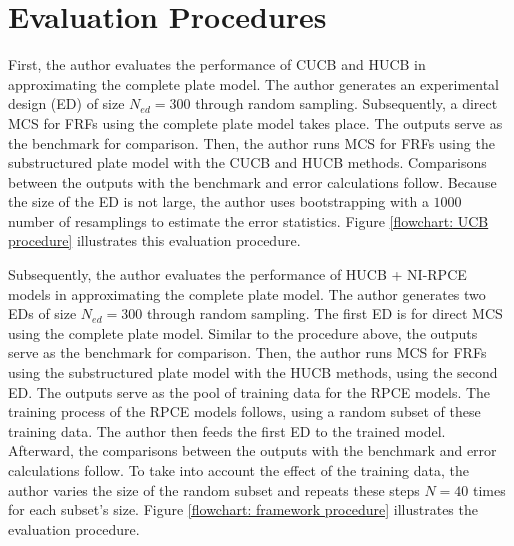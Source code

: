%
%

\section{Evaluation Procedures}
\label{sec: evaluation procedure}

First, the author evaluates the performance of CUCB and HUCB in approximating the complete plate model.
The author generates an experimental design (ED) of size $N_{ed}=300$ through random sampling.
Subsequently, a direct MCS for FRFs using the complete plate model takes place.
The outputs serve as the benchmark for comparison.
Then, the author runs MCS for FRFs using the substructured plate model with the CUCB and HUCB methods.
Comparisons between the outputs with the benchmark and error calculations follow.
Because the size of the ED is not large, the author uses bootstrapping with a $1000$ number of resamplings to estimate the error statistics.
Figure \ref{flowchart: UCB procedure} illustrates this evaluation procedure.


Subsequently, the author evaluates the performance of HUCB + NI-RPCE models in approximating the complete plate model.
The author generates two EDs of size $N_{ed}=300$ through random sampling.
The first ED is for direct MCS using the complete plate model.
Similar to the procedure above, the outputs serve as the benchmark for comparison.
Then, the author runs MCS for FRFs using the substructured plate model with the HUCB methods, using the second ED.
The outputs serve as the pool of training data for the RPCE models.
The training process of the RPCE models follows, using a random subset of these training data.
The author then feeds the first ED to the trained model.
Afterward, the comparisons between the outputs with the benchmark and error calculations follow.
To take into account the effect of the training data, the author varies the size of the random subset and repeats these steps $N=40$ times for each subset's size.
Figure \ref{flowchart: framework procedure} illustrates the evaluation procedure.
